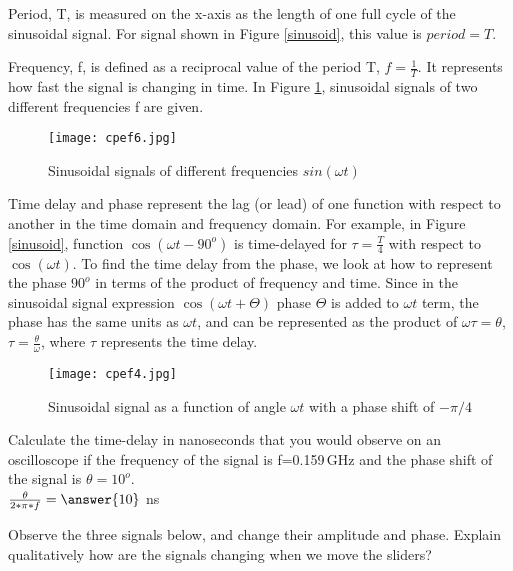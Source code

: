 \documentclass{ximera}
\begin{document}
\begin{definition}
Period, T, is measured on the x-axis as the length of one full cycle of the sinusoidal signal. For signal shown in Figure \ref{sinusoid}, this value is $period=T$. 
\end{definition}

\begin{definition}
Frequency, f,  is defined as a reciprocal value of the period T, $f=\frac{1}{T}$. It represents how fast the signal is changing in time.  In Figure \ref{sinF1F2}, sinusoidal signals of two different frequencies f are given. 

\begin{figure}[htbp]
\texttt{[image: cpef6.jpg]}
\caption{Sinusoidal signals of different frequencies $sin ( \omega t)$}
\label{sinF1F2}
\end{figure}

\end{definition}

\begin{definition}
Time delay and phase represent the lag (or lead) of one function with respect to another in the time domain and frequency domain. For example, in Figure \ref{sinusoid}, function $ \cos(\omega t - 90^o)$ is time-delayed for $\tau = \frac{T}{4}$ with respect to $\cos (\omega t)$. To find the time delay from the phase, we look at how to represent the phase $90^o$ in terms of the product of frequency and time. Since in the sinusoidal signal expression $\cos (\omega t + \Theta)$  phase $\Theta$ is added to $\omega t$ term, the phase has the same units as $\omega t$, and can be represented as the product of $\omega \tau = \theta$, $\tau = \frac{\theta}{\omega}$, where $\tau$ represents the time delay.
\end{definition}









\begin{figure} [htbp]
\texttt{[image: cpef4.jpg]}
\caption{Sinusoidal signal as a function of angle $\omega t$ with a phase shift of $-\pi/4$}
\label{sinMinus45Ph}
\end{figure}



\begin{question}  
Calculate the time-delay in nanoseconds that you would observe on an oscilloscope if the frequency of the signal is f=0.159\,GHz and the phase shift of the signal is $\theta=10^o$. \\
$ \frac{\theta}{2*\pi*f} = \answer{10}$  ns
\end{question} 

\begin{example}
Observe the three signals below, and change their amplitude and phase. Explain qualitatively how are the signals changing when we move the sliders?
\begin{center}  
\end{center} 
\end{example}
\end{document}
